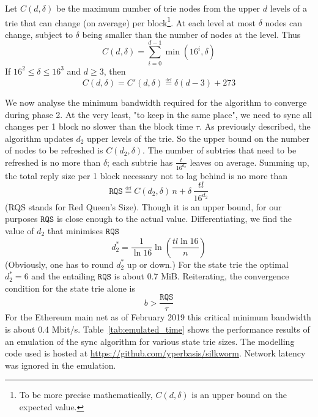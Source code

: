\documentclass{amsart}
\begin{document}
Let $C(d, \delta)$ be the maximum number of trie nodes from the upper $d$ levels of a trie that can change (on average) per block\footnote{To
be more precise mathematically, $C(d, \delta)$ is an upper bound on the expected value.}.
At each level at most $\delta$ nodes can change, subject to $\delta$ being smaller than the number of nodes at the level.
Thus
\begin{equation}
    C(d, \delta) = \sum_{i=0}^{d-1} \min(16^i, \delta)
\end{equation}
If $16^2 \leq \delta \leq 16^3$ and $d \geq 3$, then
\begin{equation}
    C(d, \delta) = C'(d, \delta) \overset{\underset{\mathrm{def}}{}}{=}
     \delta (d-3) + 273
\end{equation}

We now analyse the minimum bandwidth required for the algorithm to converge during phase 2.
At the very least, "to keep in the same place",
we need to sync all changes per 1 block no slower than the block time $\tau$.
As previously described, the algorithm updates $d_2$ upper levels of the trie.
So the upper bound on the number of nodes to be refreshed is $C(d_2, \delta)$.
The number of subtries that need to be refreshed is no more than $\delta$;
each subtrie has $\frac{t}{16^{d_2}}$ leaves on average.
Summing up, the total reply size per 1 block necessary not to lag behind is no more than
\begin{equation}
    \texttt{RQS} \overset{\underset{\mathrm{def}}{}}{=}
    C(d_2, \delta) \, n + \delta \, \frac{tl}{16^{d_2}}
\end{equation}
(RQS stands for Red Queen's Size).
Though it is an upper bound, for our purposes $\texttt{RQS}$ is close enough to the actual value.
Differentiating, we find the value of $d_2$ that minimises $\texttt{RQS}$
\begin{equation}
    d_2^* = \frac{1}{\ln 16} \ln \left( \frac{tl \ln16}{n} \right)
\end{equation}
(Obviously, one has to round $d_2^*$ up or down.)
For the state trie the optimal $d_2^* = 6$ and the entailing $\texttt{RQS}$ is about 0.7 MiB.
Reiterating, the convergence condition for the state trie alone is
\begin{equation}
    b > \frac{\texttt{RQS}}{\tau}
\end{equation}
For the Ethereum main net as of February 2019 this critical minimum bandwidth is about 0.4 Mbit/s.
Table~\ref{tab:emulated_time} shows the performance results of an emulation of the sync algorithm for various state trie sizes.
The modelling code used is hosted at
\href{https://github.com/yperbasis/silkworm/blob/master/lab/sync_emulator.cpp}{https://github.com/yperbasis/silkworm}.
Network latency was ignored in the emulation.
\end{document}
